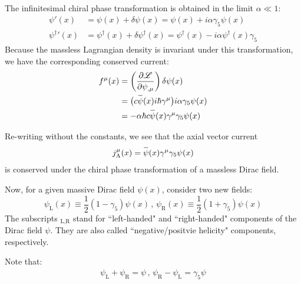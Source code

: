 \documentclass[letterpaper,12pt]{article}
\newenvironment{problem}{\subsection{}\begin{adjustwidth}{0.25in}{}\vspace{-\baselineskip}}{\end{adjustwidth}}
\newcommand{\pder}[2]{\frac{\partial #1}{\partial #2}}
\newcommand{\lagr}{\mathscr{L}}
\newcommand{\define}{\equiv}
\newcommand{\overbar}[1]{
	\mkern 1.5mu \overline{\mkern-1.5mu\raisebox{0pt}[\dimexpr\height+0.5mm\relax]{$#1$}\mkern-1.5mu}\mkern 1.5mu
}
\begin{document}
\begin{problem}
The infinitesimal chiral phase transformation is obtained in the limit $\alpha \ll 1$:
\begin{align*}
	\psi'(x) &= \psi(x) +  \delta\psi(x) = \psi(x) + i\alpha\gamma_5\psi(x)	\\
	{\psi^\dagger}'(x) &= \psi^\dagger(x) + \delta\psi^\dagger(x) = \psi^\dagger(x) - i\alpha \psi^\dagger(x) \gamma_5
\end{align*}
Because the massless Lagrangian density is invariant under this transformation, we have the corresponding conserved current:
\begin{align*}
	f^\mu (x) &= \left(\pder{\lagr}{\psi_{,\mu}}\right)\delta\psi(x)	\\
	&= \big(c\overbar{\psi}(x)i\hbar\gamma^\mu\big) i\alpha\gamma_5\psi(x)	\\
	&= -\alpha \hbar c \overbar{\psi}(x)\gamma^\mu \gamma_5 \psi(x)
\end{align*}

Re-writing without the constants, we see that the axial vector current
\begin{align*}
	j^\mu_\text{A}(x) = \overbar{\psi}(x) \gamma^\mu \gamma_5 \psi(x)
\end{align*}
is conserved under the chiral phase transformation of a massless Dirac field.

Now, for a given massive Dirac field $\psi(x)$, consider two new fields:
\begin{equation*}
	\psi_\text{L}(x) \define \frac{1}{2}\left(1-\gamma_5\right)\psi(x)	\,,\, \psi_\text{R}(x) \define \frac{1}{2}\left(1+\gamma_5\right)\psi(x)
\end{equation*}
The subscripts $_{\text{L},\text{R}}$ stand for ``left-handed" and ``right-handed" components of the Dirac field $\psi$. They are also called ``negative/positvie helicity" components, respectively.

Note that:
\begin{align*}
	\psi_\text{L} + \psi_\text{R} = \psi \,,\,
	\psi_\text{R} - \psi_\text{L} = \gamma_5 \psi
\end{align*}


\end{problem}
\end{document}
